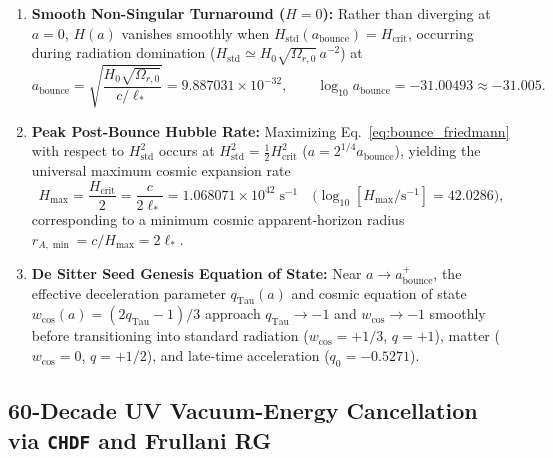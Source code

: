 \documentclass[11pt,a4paper]{article}
\theoremstyle{remark}
\begin{document}
\begin{enumerate}
  \item \textbf{Smooth Non-Singular Turnaround ($H = 0$):} Rather than diverging at $a = 0$, $H(a)$ vanishes smoothly when $H_{\mathrm{std}}(a_{\mathrm{bounce}}) = H_{\mathrm{crit}}$, occurring during radiation domination ($H_{\mathrm{std}} \simeq H_0\sqrt{\Omega_{r,0}}\,a^{-2}$) at
  \begin{equation}
    a_{\mathrm{bounce}} = \sqrt{\frac{H_0\sqrt{\Omega_{r,0}}}{c/\ell_*}} = 9.887031 \times 10^{-32}, \qquad \log_{10} a_{\mathrm{bounce}} = -31.00493 \approx -31.005.
    \label{eq:a_bounce}
  \end{equation}
  \item \textbf{Peak Post-Bounce Hubble Rate:} Maximizing Eq.~\eqref{eq:bounce_friedmann} with respect to $H_{\mathrm{std}}^2$ occurs at $H_{\mathrm{std}}^2 = \frac{1}{2}H_{\mathrm{crit}}^2$ ($a = 2^{1/4}a_{\mathrm{bounce}}$), yielding the universal maximum cosmic expansion rate
  \begin{equation}
    H_{\max} = \frac{H_{\mathrm{crit}}}{2} = \frac{c}{2\ell_*} = 1.068071 \times 10^{42}\;\mathrm{s}^{-1} \quad \bigl(\log_{10}[H_{\max}/\mathrm{s}^{-1}] = 42.0286\bigr),
    \label{eq:h_max_bounce}
  \end{equation}
  corresponding to a minimum cosmic apparent-horizon radius $r_{A,\min} = c/H_{\max} = 2\ell_*$.
  \item \textbf{De Sitter Seed Genesis Equation of State:} Near $a \to a_{\mathrm{bounce}}^+$, the effective deceleration parameter $q_{\mathrm{Tau}}(a)$ and cosmic equation of state $w_{\mathrm{cos}}(a) = (2q_{\mathrm{Tau}} - 1)/3$ approach $q_{\mathrm{Tau}} \to -1$ and $w_{\mathrm{cos}} \to -1$ smoothly before transitioning into standard radiation ($w_{\mathrm{cos}} = +1/3$, $q = +1$), matter ($w_{\mathrm{cos}} = 0$, $q = +1/2$), and late-time acceleration ($q_0 = -0.5271$).
\end{enumerate}

\subsection{60-Decade UV Vacuum-Energy Cancellation via \texttt{CHDF} and Frullani RG}
\end{document}

